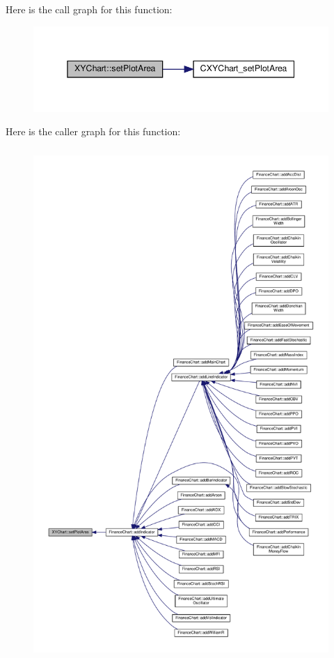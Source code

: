Here is the call graph for this function\+:
\nopagebreak
\begin{figure}[H]
\begin{center}
\leavevmode
\includegraphics[width=345pt]{class_x_y_chart_ae33eba813b2503538a2f359ed08d81a5_cgraph}
\end{center}
\end{figure}
Here is the caller graph for this function\+:
\nopagebreak
\begin{figure}[H]
\begin{center}
\leavevmode
\includegraphics[height=550pt]{class_x_y_chart_ae33eba813b2503538a2f359ed08d81a5_icgraph}
\end{center}
\end{figure}
\mbox{\label{class_x_y_chart_a3fed05334f9e4b6e0a9487dadd8cc5dd}} 
